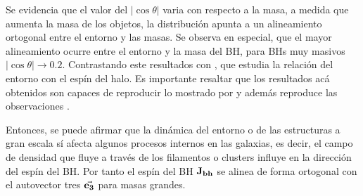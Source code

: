 Se evidencia que el valor del $|\cos \theta|$ varia con respecto a la masa, a medida que aumenta la masa de los objetos, la distribución apunta a un alineamiento ortogonal entre el entorno y las masas. Se observa en especial, que el mayor alineamiento ocurre entre el entorno y la masa del BH, para BHs muy masivos $|\cos\theta| \to 0.2$. Contrastando este resultados con \cite{wang2018}, que estudia la relación del entorno con el espín del halo. Es importante resaltar que los resultados acá obtenidos son capaces de reproducir lo mostrado por \cite{wang2018} y además reproduce las observaciones \cite{hutsemekers2014}.

Entonces, se puede afirmar que la dinámica del entorno o de las  estructuras a gran escala sí afecta algunos procesos internos en las galaxias, es decir, el campo de densidad que fluye a través de los filamentos o clusters influye en la dirección del espín del BH. Por tanto el espín del BH ${\bf{J_{bh}}}$ se alinea de forma ortogonal con el autovector tres $\vec{\bf{e}_3}$ para masas grandes. 
%


